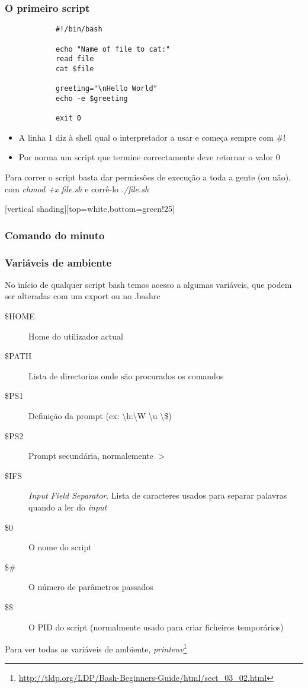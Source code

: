 \documentclass[t,notes=show]{beamer}
\begin{document}
	\begin{frame}[fragile]
		\frametitle{O primeiro script}
		\begin{lstlisting}
			#!/bin/bash

			echo "Name of file to cat:"
			read file
			cat $file

			greeting="\nHello World"
			echo -e $greeting

			exit 0
		\end{lstlisting}
		\begin{itemize}
			\item A linha 1 diz à shell qual o interpretador a usar e começa sempre com \#!
			\item Por norma um script que termine correctamente deve retornar o valor 0
		\end{itemize}
		
		{\small Para correr o script basta dar permissões de execução a toda a gente (ou não), com \emph{chmod +x file.sh} e corrê-lo \emph{./file.sh}}
	\end{frame}		
	
	\begingroup
		[vertical shading][top=white,bottom=green!25]
	 
		\begin{frame}
			\frametitle{Comando do minuto}
		\end{frame}	
	\endgroup
	
	\begin{frame}
		\frametitle{Variáveis de ambiente}
		
		No início de qualquer script bash temos acesso a algumas variáveis, que podem ser alteradas com um export ou no .bashrc
		
		{\footnotesize
		\begin{description}
			\item[\$HOME] Home do utilizador actual
			\item[\$PATH] Lista de directorias onde são procurados os comandos
			\item[\$PS1] Definição da prompt (ex: \textbackslash h:\textbackslash W \textbackslash u \textbackslash \$)
			\item[\$PS2] Prompt secundária, normalemente $>$
			\item[\$IFS] \emph{Input Field Separator}. Lista de caracteres usados para separar palavras quando a ler do \emph{input}
			\item[\$0] O nome do script
			\item[\$\#] O número de parâmetros passados
			\item[\$\$] O PID do script (normalmente usado para criar ficheiros temporários) 
		\end{description}
		}
		
		Para ver todas as variáveis de ambiente, \emph{printenv}\footnote{\url{http://tldp.org/LDP/Bash-Beginners-Guide/html/sect_03_02.html}}
		
	\end{frame}	
	
\end{document}
